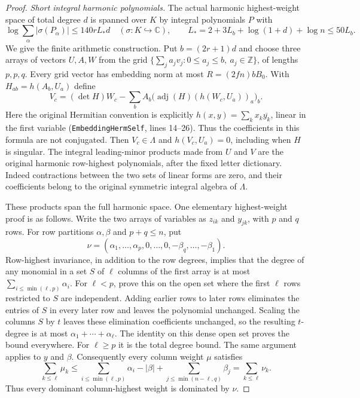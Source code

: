 \begin{proof}
\emph{Short integral harmonic polynomials.}
The actual harmonic highest-weight space of total degree $d$ is
spanned over $K$ by integral polynomials $P$ with
\begin{equation}\label{eq:actual-short-harmonic-bound}
 \log\sum_\alpha|\sigma(P_\alpha)|\le140rL_*d
 \quad(\sigma:K\hookrightarrow\mathbb C),
 \qquad
 L_*=2+3L_b+\log(1+d)+\log n\le50L_b.
\end{equation}
We give the finite arithmetic construction.  Put $b=(2r+1)d$ and
choose three arrays of vectors $U,A,W$ from the grid
$\{\sum_j a_jv_j:0\le a_j\le b,\ a_j\in\mathbb Z\}$, of
lengths $p,p,q$.  Every grid vector has embedding norm at most
$R=(2fn)bB_0$.  With $H_{ab}=h(A_b,U_a)$ define
\[
 V_c=(\det H)W_c-
       \sum_b A_b\bigl(\operatorname{adj}(H)
                         (h(W_c,U_a))_a\bigr)_b.
\]
Here the original Hermitian convention is explicitly
$h(x,y)=\sum_kx_k\overline{y_k}$, linear in the first variable
(\texttt{EmbeddingHermSelf}, lines 14--26).  Thus the coefficients
in this formula are not conjugated.
Then $V_c\in\Lambda$ and $h(V_c,U_a)=0$, including when $H$ is
singular.  The integral leading-minor products made from $U$ and $V$
are the original harmonic row-highest polynomials, after the fixed
letter dictionary.  Indeed contractions between the two sets of linear
forms are zero, and their coefficients belong to the original symmetric
integral algebra of $\Lambda$.

These products span the full harmonic space.  One elementary
highest-weight proof is as follows.  Write the two arrays of variables
as $z_{ik}$ and $y_{jk}$, with $p$ and $q$ rows.  For row partitions
$\alpha,\beta$ and $p+q\le n$, put
\[
 \nu=(\alpha_1,\ldots,\alpha_p,0,\ldots,0,
                         -\beta_q,\ldots,-\beta_1).
\]
Row-highest invariance, in addition to the row degrees, implies that
the degree of any monomial in a set $S$ of $\ell$ columns of the first
array is at most $\sum_{i\le\min(\ell,p)}\alpha_i$.
For $\ell<p$, prove this on the open set where the first $\ell$ rows
restricted to $S$ are independent.  Adding earlier rows to later rows
eliminates the entries of $S$ in every later row and leaves the
polynomial unchanged.  Scaling the columns $S$ by $t$ leaves these
elimination coefficients unchanged, so the resulting $t$-degree is
at most $\alpha_1+\cdots+\alpha_\ell$.  The identity on this dense
open set proves the bound everywhere.  For $\ell\ge p$ it is the
total degree bound.  The same argument applies to $y$ and $\beta$.
Consequently every column weight $\mu$ satisfies
\[
 \sum_{k\le\ell}\mu_k
 \le\sum_{i\le\min(\ell,p)}\alpha_i-|\beta|
       +\sum_{j\le\min(n-\ell,q)}\beta_j
 =\sum_{k\le\ell}\nu_k.
\]
Thus every dominant column-highest weight is dominated by $\nu$.


\end{proof}
